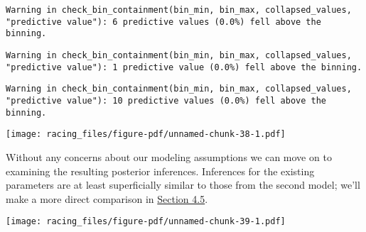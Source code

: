 \documentclass[
  letterpaper,
  DIV=11,
  numbers=noendperiod]{scrartcl}
\newenvironment{Shaded}{\begin{snugshade}}{\end{snugshade}}
\newcommand{\AttributeTok}[1]{\textcolor[rgb]{0.40,0.45,0.13}{#1}}
\newcommand{\DecValTok}[1]{\textcolor[rgb]{0.68,0.00,0.00}{#1}}
\newcommand{\FunctionTok}[1]{\textcolor[rgb]{0.28,0.35,0.67}{#1}}
\newcommand{\NormalTok}[1]{\textcolor[rgb]{0.00,0.23,0.31}{#1}}
\newcommand{\SpecialCharTok}[1]{\textcolor[rgb]{0.37,0.37,0.37}{#1}}
\newcommand{\StringTok}[1]{\textcolor[rgb]{0.13,0.47,0.30}{#1}}
\begin{document}
\begin{verbatim}
Warning in check_bin_containment(bin_min, bin_max, collapsed_values,
"predictive value"): 6 predictive values (0.0%) fell above the binning.
\end{verbatim}

\begin{verbatim}
Warning in check_bin_containment(bin_min, bin_max, collapsed_values,
"predictive value"): 1 predictive value (0.0%) fell above the binning.
\end{verbatim}

\begin{verbatim}
Warning in check_bin_containment(bin_min, bin_max, collapsed_values,
"predictive value"): 10 predictive values (0.0%) fell above the binning.
\end{verbatim}

\texttt{[image: racing\_files/figure-pdf/unnamed-chunk-38-1.pdf]}

Without any concerns about our modeling assumptions we can move on to
examining the resulting posterior inferences. Inferences for the
existing parameters are at least superficially similar to those from the
second model; we'll make a more direct comparison in
\hyperref[sec:inf-comp]{Section 4.5}.

\begin{Shaded}
\end{Shaded}

\texttt{[image: racing\_files/figure-pdf/unnamed-chunk-39-1.pdf]}
\end{document}
